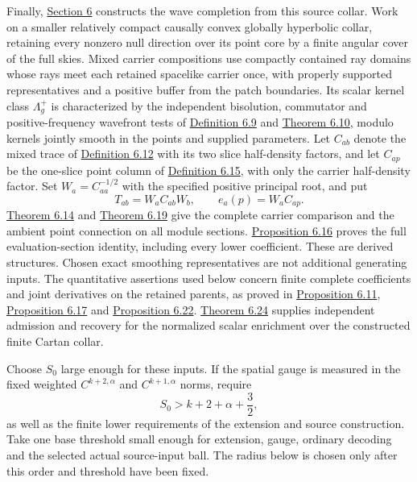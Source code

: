 \documentclass[
  english,
  11pt,
  reqno]{amsart}
\begin{document}
Finally, \hyperref[sec:online-covariant-wave-enrichment]{Section 6}
constructs the wave completion from this source collar. Work on a
smaller relatively compact causally convex globally hyperbolic collar,
retaining every nonzero null direction over its point core by a finite
angular cover of the full skies. Mixed carrier compositions use
compactly contained ray domains whose rays meet each retained spacelike
carrier once, with properly supported representatives and a positive
buffer from the patch boundaries. Its scalar kernel class
\(\Lambda_g^+\) is characterized by the independent bisolution,
commutator and positive-frequency wavefront tests of
\hyperref[def:online-independent-wave-kernel]{Definition 6.9} and
\hyperref[thm:online-canonical-wave-kernel]{Theorem 6.10}, modulo
kernels jointly smooth in the points and supplied parameters. Let
\(C_{ab}\) denote the mixed trace of
\hyperref[def:online-wave-carrier-displays]{Definition 6.12} with its
two slice half-density factors, and let \(C_{ap}\) be the one-slice
point column of \hyperref[def:online-wave-evaluation-section]{Definition
6.15}, with only the carrier half-density factor. Set
\(W_a=C_{aa}^{-1/2}\) with the specified positive principal root, and
put%
 \[
T_{ab}=W_aC_{ab}W_b,\qquad
e_a(p)=W_aC_{ap}.
\] \hyperref[thm:online-wave-carrier-cocycle]{Theorem 6.14} and
\hyperref[thm:online-ambient-point-connection]{Theorem 6.19} give the
complete carrier comparison and the ambient point connection on all
module sections.
\hyperref[prop:online-wave-full-evaluation-comparison]{Proposition 6.16}
proves the full evaluation-section identity, including every lower
coefficient. These are derived structures. Chosen exact smoothing
representatives are not additional generating inputs. The quantitative
assertions used below concern finite complete coefficients and joint
derivatives on the retained parents, as proved in
\hyperref[prop:online-wave-kernel-finite-families]{Proposition 6.11},
\hyperref[prop:online-wave-carrier-families-scale]{Proposition 6.17} and
\hyperref[prop:online-point-connection-finite-families]{Proposition
6.22}. \hyperref[thm:online-wave-enrichment-recognition]{Theorem 6.24}
supplies independent admission and recovery for the normalized scalar
enrichment over the constructed finite Cartan collar.

Choose \(S_0\) large enough for these inputs. If the spatial gauge is
measured in the fixed weighted \(C^{k+2,\alpha}\) and \(C^{k+1,\alpha}\)
norms, require%
 \[
S_0>k+2+\alpha+\frac32,
\] as well as the finite lower requirements of the extension and source
construction. Take one base threshold small enough for extension, gauge,
ordinary decoding and the selected actual source-input ball. The radius
below is chosen only after this order and threshold have been fixed.
\end{document}
